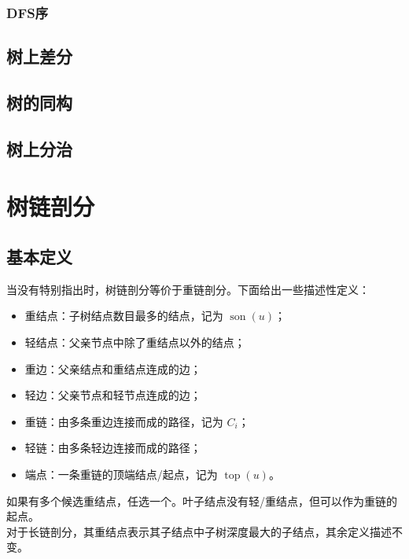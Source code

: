 \documentclass[12pt,a4paper]{article}
\begin{document}
\subsubsection{DFS序}
\subsection{树上差分}
\subsection{树的同构}
\subsection{树上分治} %

\newpage
\section{树链剖分}
\subsection{基本定义}
当没有特别指出时，树链剖分等价于重链剖分。下面给出一些描述性定义：
\begin{itemize}
	\item 重结点：子树结点数目最多的结点，记为 $\operatorname{son}(u)$；
	\item 轻结点：父亲节点中除了重结点以外的结点；
	\item 重边：父亲结点和重结点连成的边；
	\item 轻边：父亲节点和轻节点连成的边；
	\item 重链：由多条重边连接而成的路径，记为 $C_i$；
	\item 轻链：由多条轻边连接而成的路径；
	\item 端点：一条重链的顶端结点/起点，记为 $\operatorname{top}(u)$。
\end{itemize}
如果有多个候选重结点，任选一个。叶子结点没有轻/重结点，但可以作为重链的起点。\\
对于长链剖分，其重结点表示其子结点中子树深度最大的子结点，其余定义描述不变。
\end{document}
